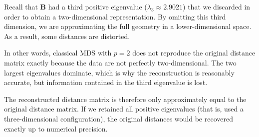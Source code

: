 Recall that $\mathbf{B}$ had a third positive eigenvalue
($\lambda_3 \approx 2.9021$) that we discarded in order to obtain
a two-dimensional representation. By omitting this third dimension,
we are approximating the full geometry in a lower-dimensional space.
As a result, some distances are distorted.

\medskip

In other words, classical MDS with $p=2$ does not reproduce the
original distance matrix exactly because the data are not perfectly
two-dimensional. The two largest eigenvalues dominate, which is why
the reconstruction is reasonably accurate, but information contained
in the third eigenvalue is lost.

\medskip

The reconstructed distance matrix is therefore only approximately
equal to the original distance matrix. If we retained all positive
eigenvalues (that is, used a three-dimensional configuration),
the original distances would be recovered exactly up to numerical
precision.


